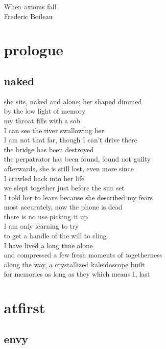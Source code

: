 \documentclass{article}
\begin{document}
\vfill
When axioms fall\\
Frederic Boileau\\
\vfill
\clearpage


\setlength{\parindent}{0.0cm}
\small

%

\section{prologue}

\subsection{naked}
she sits, naked and alone; her shaped dimmed\\
by the low light of memory\\
my throat fills with a sob\\
I can see the river swallowing her\\
I am not that far, though I can't drive there\\
the bridge has been destroyed\\
the perpatrator has been found, found not guilty\\
afterwards, she is still lost, even more since\\
I crawled back into her life\\
we slept together just before the sun set\\
I told her to leave because she described my fears\\
most accurately, now the phone is dead\\
there is no use picking it up\\
I am only learning to try\\
to get a handle of the will to cling\\

I have lived a long time alone\\
and compressed a few fresh moments of togetherness\\
along the way, a crystallized kaleidoscope built\\
for memories as long as they which means I, last


\section{atfirst}
\subsection{envy}
\end{document}
